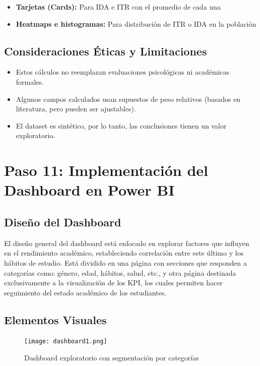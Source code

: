 \documentclass[12pt,letterpaper]{report}
\begin{document}
\begin{itemize}
    \item \textbf{Tarjetas (Cards):} Para IDA e ITR con el promedio de cada una
    \item \textbf{Heatmaps e histogramas:} Para distribución de ITR o IDA en la población
\end{itemize}

\subsection{Consideraciones Éticas y Limitaciones}

\begin{itemize}
    \item Estos cálculos no reemplazan evaluaciones psicológicas ni académicas formales.
    \item Algunos campos calculados usan supuestos de peso relativos (basados en literatura, pero pueden ser ajustables).
    \item El dataset es sintético, por lo tanto, las conclusiones tienen un valor exploratorio.
\end{itemize}


\section{Paso 11: Implementación del Dashboard en Power BI}

\subsection{Diseño del Dashboard}

El diseño general del dashboard está enfocado en explorar factores que influyen en el rendimiento académico, estableciendo correlación entre este último y los hábitos de estudio. Está dividido en una página con secciones que responden a categorías como: género, edad, hábitos, salud, etc., y otra página destinada exclusivamente a la visualización de los KPI, los cuales permiten hacer seguimiento del estado académico de los estudiantes.

\subsection{Elementos Visuales}

\begin{figure}[!ht]
    \centering
    \texttt{[image: dashboard1.png]}
    \caption{Dashboard exploratorio con segmentación por categorías}
    \label{fig:dashboard1}
\end{figure}
\end{document}
